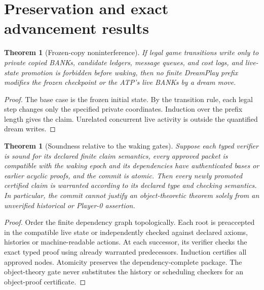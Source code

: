 \documentclass[11pt,letterpaper]{article}
\theoremstyle{definition}
\theoremstyle{plain}
\newtheorem{theorem}[definition]{Theorem}
\theoremstyle{definition}
\begin{document}
\section{Preservation and exact advancement results}\label{gl-first-W0-s11}
\begin{theorem}[Frozen-copy noninterference]
If legal game transitions write only to private copied BANKs, candidate ledgers, message queues, and cost logs, and live-state promotion is forbidden before waking, then no finite DreamPlay prefix modifies the frozen checkpoint or the ATP's live BANKs \emph{by a dream move}.
\end{theorem}
\begin{proof}The base case is the frozen initial state. By the transition rule, each legal step changes only the specified private coordinates. Induction over the prefix length gives the claim. Unrelated concurrent live activity is outside the quantified dream writes.\end{proof}

\begin{theorem}[Soundness relative to the waking gates]
Suppose each typed verifier is sound for its declared finite claim semantics, every approved packet is compatible with the waking epoch and its dependencies have authenticated bases or earlier acyclic proofs, and the commit is atomic. Then every newly promoted certified claim is warranted according to its declared type and checking semantics. In particular, the commit cannot justify an object-theoretic theorem solely from an unverified historical or Player-0 assertion.
\end{theorem}
\begin{proof}
Order the finite dependency graph topologically. Each root is preaccepted in the compatible live state or independently checked against declared axioms, histories or machine-readable actions. At each successor, its verifier checks the exact typed proof using already warranted predecessors. Induction certifies all approved nodes. Atomicity preserves the dependency-complete package. The object-theory gate never substitutes the history or scheduling checkers for an object-proof certificate.
\end{proof}
\end{document}

